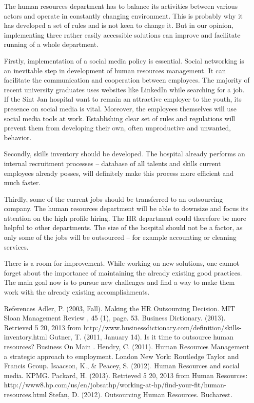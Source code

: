 \documentclass[a4paper,fleqn,11pt,dvips,titlepage]{article}
\numberwithin{figure}{section}
\numberwithin{equation}{section}
\begin{document}
The human resources department has to balance its activities between various actors and operate in constantly changing environment. This is probably why it has developed a set of rules and is not keen to change it. But in our opinion, implementing three rather easily accessible solutions can improve and facilitate running of a whole department. 

Firstly, implementation of a social media policy is essential. Social networking is an inevitable step in development of human resources management. It can facilitate the communication and cooperation between employees. The majority of recent university graduates uses websites like LinkedIn while searching for a job. If the Sint Jan hospital want to remain an attractive employer to the youth, its presence on social media is vital. Moreover, the employees themselves will use social media tools at work. Establishing clear set of rules and regulations will prevent them from developing their own, often unproductive and unwanted, behavior. 

Secondly, skills inventory should be developed. The hospital already performs an internal recruitment processes – database of all talents and skills current employees already posses, will definitely make this process more efficient and much faster. 

Thirdly, some of the current jobs should be transferred to an outsourcing company. The human resources department will be able to downsize and focus its attention on the high profile hiring. The HR department could therefore be more helpful to other departments. The size of the hospital should not be a factor, as only some of the jobs will be outsourced – for example accounting or cleaning services. 

There is a room for improvement. While working on new solutions, one cannot forget about the importance of maintaining the already existing good practices. The main goal now is to pursue new challenges and find a way to make them work with the already existing accomplishments. 

























References
Adler, P. (2003, Fall). Making the HR Outsourcing Decision. MIT Sloan Management Review , 45 (1), page. 53.
Business Dictionary. (2013). Retrieved 5 20, 2013 from http://www.businessdictionary.com/definition/skills-inventory.html
Gutner, T. (2011, January 14). Is it time to outsource human resources? Business On Main .
Hendry, C. (2011). Human Resources Management a strategic approach to employment. London New York: Routledge Taylor and Francis Group.
Isaacson, K., & Peacey, S. (2012). Human Resources and social media. KPMG.
Packard, H. (2013). Retrieved 5 20, 2013 from Human Resources: http://www8.hp.com/us/en/jobsathp/working-at-hp/find-your-fit/human-resources.html
Stefan, D. (2012). Outsourcing Human Resources. Bucharest.
\end{document}
